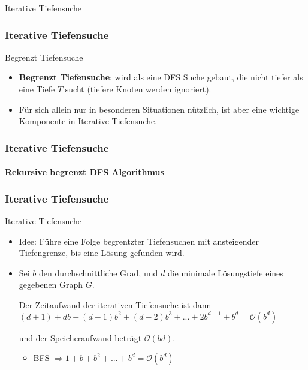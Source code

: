 \begin{frame}
		\Huge Iterative Tiefensuche
\end{frame}
	
\begin{frame}
	\frametitle{Iterative Tiefensuche}
	\begin{KITinfoblock}{Begrenzt Tiefensuche}
	\begin{itemize}
		\item \textbf{Begrenzt Tiefensuche}: wird als eine DFS Suche gebaut, die nicht tiefer als eine Tiefe $T$ sucht (tiefere Knoten werden ignoriert).
		\item Für sich allein nur in besonderen Situationen nützlich, ist aber eine wichtige Komponente in Iterative Tiefensuche.
	\end{itemize}
	\end{KITinfoblock}
\end{frame}

\begin{frame}
	\frametitle{Iterative Tiefensuche}
	\framesubtitle{Rekursive begrenzt DFS Algorithmus}
		
\end{frame}

\begin{frame}
	\frametitle{Iterative Tiefensuche}
	\begin{KITinfoblock}{Iterative Tiefensuche}
		\begin{itemize}
			\item Idee: Führe eine Folge begrentzter Tiefensuchen mit ansteigender Tiefengrenze, bis eine Lösung gefunden wird.
			
			\item Sei $b$ den durchschnittliche Grad, und $d$ die minimale Lösungstiefe eines gegebenen Graph $G$.
			  
			\vspace{0.08in}
			Der Zeitaufwand der iterativen Tiefensuche ist dann
			\linebreak[2]
			$(d+1) + db + (d-1)b^2 + (d-2)b^3 + ... + 2b^{d-1} + b^d = \mathcal{O}(b^d)$
			
			und der Speicheraufwand beträgt $\mathcal{O}(bd)$.
			\begin{itemize}
				\item BFS $\Rightarrow 1 + b + b^2 + ... + b^d = \mathcal{O}(b^d)$
			\end{itemize}			
		\end{itemize}
	\end{KITinfoblock}
	\pause
	
	
\end{frame}

